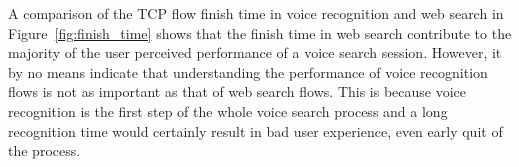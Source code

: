 

A comparison of the TCP flow finish time in voice recognition and web search in Figure~\ref{fig:finish_time} shows that the finish time in web search contribute to the majority of the user perceived performance of a voice search session. However, it by no means indicate that understanding the performance of voice recognition flows is not as important as that of web search flows. This is because voice recognition is the first step of the whole voice search process and a long recognition time would certainly result in bad user experience, even early quit of the process.


